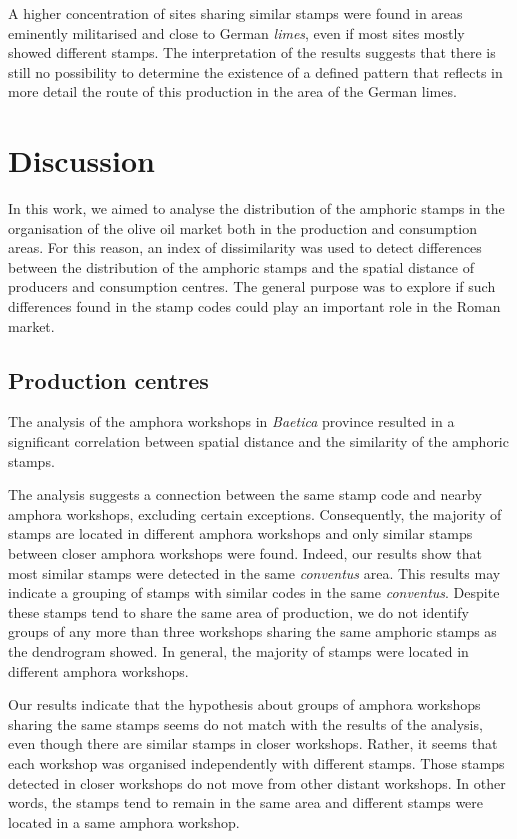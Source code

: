 \documentclass[review]{elsarticle}
\begin{document}
A higher concentration of sites sharing similar stamps were found in areas eminently militarised and close to German \textit{limes}, even if most sites mostly showed different stamps.
The interpretation of the results suggests that there is still no possibility to determine the existence of a defined pattern that reflects in more detail the route of this production in the area of the German limes.


\section{Discussion}


In this work, we aimed to analyse the distribution of the amphoric stamps in the organisation of the olive oil market both in the production and consumption areas. For this reason, an index of dissimilarity was used to detect differences between the distribution of the amphoric stamps and the spatial distance of producers and consumption centres. The general purpose was to explore if such differences found in the stamp codes could play an important role in the Roman market.  

\subsection{Production centres}

The analysis of the amphora workshops in \textit{Baetica} province resulted in a significant correlation between spatial distance and the similarity of the amphoric stamps. 

The analysis suggests a connection between the same stamp code and nearby amphora workshops, excluding certain exceptions. Consequently, the majority of stamps are located in different amphora workshops and only similar stamps between closer amphora workshops were found. Indeed, our results show that most similar stamps were detected in the same \textit{conventus} area. This results may indicate a grouping of stamps with similar codes in the same \textit{conventus}. Despite these stamps tend to share the same area of production, we do not identify groups of any more than three workshops sharing the same amphoric stamps as the dendrogram showed. In general, the majority of stamps were located in different amphora workshops. 

Our results indicate that the hypothesis about groups of amphora workshops sharing the same stamps seems do not match with the results of the analysis, even though there are similar stamps in closer workshops. Rather, it seems that each workshop was organised independently with different stamps. Those stamps detected in closer workshops do not move from other distant workshops. In other words, the stamps tend to remain in the same area and different stamps were located in a same amphora workshop. 
\end{document}
